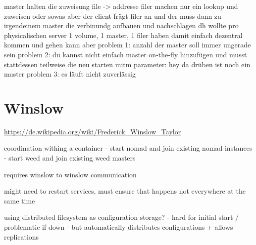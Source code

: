 master halten die zuweisung file -> addresse
filer machen nur ein lookup und zuweisen oder sowas
aber der client frägt filer an
und der muss dann zu irgendeinem master die verbinundg aufbauen und nachschlagen
dh wollte pro physicalischen server 1 volume, 1 master, 1 filer haben
damit einfach dezentral kommen und gehen kann
aber problem 1: anzahl der master soll immer ungerade sein
problem 2: du kannst nicht einfach master on-the-fly hinzufügen und musst stattdessen teilweise die neu starten mitm parameter: hey da drüben ist noch ein master
problem 3: es läuft nicht zuverlässig

\section{Winslow}
\url{https://de.wikipedia.org/wiki/Frederick_Winslow_Taylor}

coordination withing a container
 - start nomad and join existing nomad instances
 - start weed and join existing weed masters
 
requires winslow to winslow communication

might need to restart services, must ensure that happens not everywhere at the same time

using distributed filesystem as configuration storage?
 - hard for initial start / problematic if down
 - but automatically distributes configurations + allows replications